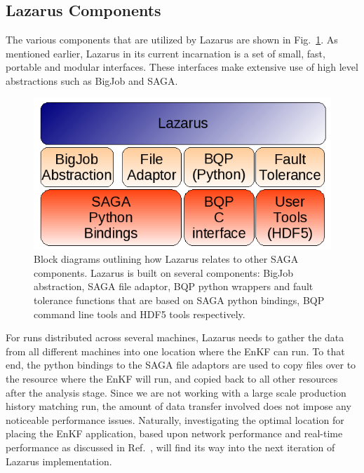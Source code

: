 \documentclass{sig-alternate}
\newcommand{\up}{\vspace*{-0.3em}}
\begin{document}
\subsection{Lazarus Components}

The various components that are utilized by Lazarus are shown in Fig.~\ref{fig:application_architecture}.  As mentioned earlier, Lazarus in its current incarnation is a set of small, fast, portable and modular interfaces. These interfaces make extensive use of high level abstractions such as BigJob and SAGA.

\begin{figure} 
  \begin{center} \includegraphics[scale=0.5]{./figures/Architecture.png} \caption{Block diagrams outlining how Lazarus relates to other SAGA components. Lazarus is built on several components: BigJob abstraction, SAGA file adaptor, BQP python wrappers and fault tolerance functions that are based on SAGA python bindings, BQP command line tools and HDF5 tools respectively.}\label{fig:application_architecture}
\up\up\up\up\up\up\up%
\end{center}
\end{figure}

For runs distributed across several machines, Lazarus needs to gather the data from all different machines into one location where the EnKF can run. To that end, the python bindings to the SAGA file adaptors are used to copy files over to the resource where the EnKF will run, and copied back to all other resources after the analysis stage. Since we are not working with a large scale production history matching run, the amount of data transfer involved does not impose any noticeable performance issues. Naturally, investigating the optimal location for placing the EnKF application, based upon network performance and real-time performance as discussed in Ref.~\cite{escience07}, will find its way into the next iteration of Lazarus implementation.
\end{document}

